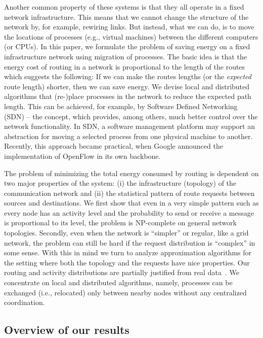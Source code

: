 \documentclass[conference]{IEEEtran}
\begin{document}
Another common property of these systems is that they all operate in a fixed network infrastructure. This means that we cannot change the structure of the network by, for example, rewiring links. But instead, what we can do, is to move the locations of processes (e.g., virtual machines) between the different computers (or CPUs). 
In this paper, we formulate the problem of saving energy on a fixed infrastructure network using migration of processes. 
The basic idea is that the energy cost of routing in a network is proportional to the length of the routes which suggests the following: If we can make the routes lengths (or the \emph{expected} route length) shorter, then we can save energy. We devise local and distributed algorithms that (re-)place processes in the network to reduce the expected path length.
This can be achieved, for example, by Software Defined Networking (SDN) \cite{SDN:2009} -- the concept, which provides, among others, much better control over the network functionality. 
In SDN, a software management platform may support an abstraction for moving a selected process from one physical machine to another. Recently, this approach became practical, when Google announced \cite{summit:google:talk} the implementation of OpenFlow \cite{McKeown:2008:Openflow} in its own backbone.

The problem of minimizing the total energy consumed by routing is dependent on two major properties of the system: (i) the infrastructure (topology) of the communication network and (ii) the statistical pattern of route requests between sources and destinations. We first show that even in a very simple pattern such as every node has an activity level and the probability to send or receive a message is proportional to its level, the problem is NP-complete on general network topologies. Secondly, even when the network is ``simpler'' or regular, like a grid network, the problem can still be hard if the request distribution is ``complex'' in some sense. With this in mind we turn to analyze approximation algorithms for the setting where both the topology and the requests have nice properties. Our routing and activity distributions are partially justified from real data~\cite{gummadi2003measurement,klemm2004characterizing}. We concentrate on local and distributed algorithms, namely, processes can be exchanged (i.e., relocated) only between nearby nodes without any centralized coordination.

\subsection{Overview of our results}
\end{document}
